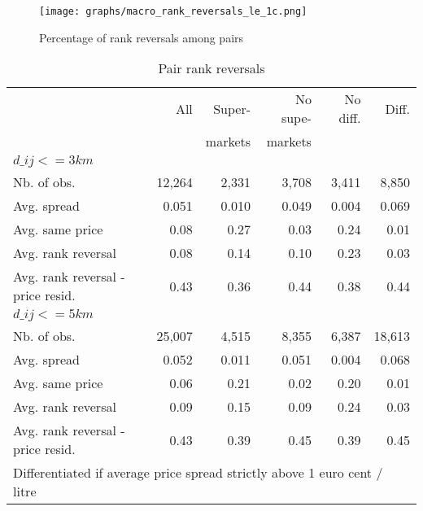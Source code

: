 \documentclass[english]{article}
\begin{document}
\begin{figure}[!h]
    \caption{Percentage of rank reversals among pairs}
	\centering
		\texttt{[image: graphs/macro\_rank\_reversals\_le\_1c.png]}
\end{figure}

\begin{table}
\caption{Pair rank reversals}
\centering
\begin{tabular}{lrrrrr}
\hline
\hline
    & All   & Super- & No supe- & No diff. & Diff. \\
    &       & markets & markets &       &  \\
    \hline
    $d\_{ij} <= 3 km$ &       &       &       &       &  \\
    \hline
    Nb. of obs. & 12,264 & 2,331 & 3,708 & 3,411 & 8,850 \\
    Avg. spread & 0.051 & 0.010 & 0.049 & 0.004 & 0.069 \\
    Avg. same price & 0.08  & 0.27  & 0.03  & 0.24  & 0.01 \\
    Avg. rank reversal & 0.08  & 0.14  & 0.10  & 0.23  & 0.03 \\
    Avg. rank reversal - price resid. & 0.43  & 0.36  & 0.44  & 0.38  & 0.44 \\
    \hline
    $d\_{ij} <= 5 km$ &       &       &       &       &  \\
    Nb. of obs. & 25,007 & 4,515 & 8,355 & 6,387 & 18,613 \\
    Avg. spread & 0.052 & 0.011 & 0.051 & 0.004 & 0.068 \\
    Avg. same price & 0.06  & 0.21  & 0.02  & 0.20  & 0.01 \\
    Avg. rank reversal & 0.09  & 0.15  & 0.09  & 0.24  & 0.03 \\
    Avg. rank reversal - price resid. & 0.43  & 0.39  & 0.45  & 0.39  & 0.45 \\

\hline
\hline
\multicolumn{6}{l}{\small Differentiated if average price spread strictly above 1 euro cent / litre}\\
\end{tabular}
\end{table}
\end{document}
